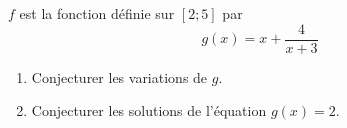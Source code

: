 
$f$ est la fonction définie sur $[2;5]$ par $$g(x)=x+\frac{4}{x+3}$$
\begin{enumerate}
\item Conjecturer les variations de $g$.
\item Conjecturer les solutions de l'équation $g(x)=2$.
\end{enumerate}
